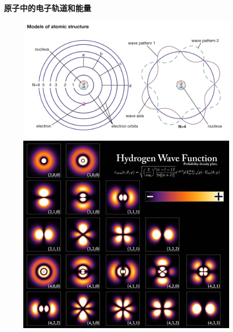 {\frame
{
	\frametitle{原子中的电子轨道和能量}
\begin{minipage}{0.43\textwidth}
\begin{figure}[h!]
	\vspace{-4.8pt}
\centering
\includegraphics[height=0.57\textwidth,width=1.00\textwidth,viewport=0 50 1680 1000,clip]{Figures/electron-theory-Bohr-point-mass-energy-levels.jpg}
\includegraphics[height=0.95\textwidth,width=1.00\textwidth,viewport=0 0 630 650,clip]{Figures/wave_function-2.jpeg}
\label{Atomic-electron_wave}
\end{figure}
\end{minipage}
}}
